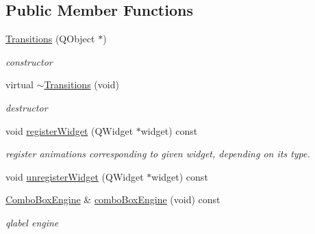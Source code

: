 \subsection*{Public Member Functions}
\begin{DoxyCompactItemize}
\item 
\mbox{\label{class_transitions_a23f782436a280c05ab98de42a51429d0}} 
\hyperlink{class_transitions_a23f782436a280c05ab98de42a51429d0}{Transitions} (Q\+Object $\ast$)
\begin{DoxyCompactList}\small\item\em constructor \end{DoxyCompactList}\item 
\mbox{\label{class_transitions_a1a6058f364276b83832cc7036c8f2f62}} 
virtual \hyperlink{class_transitions_a1a6058f364276b83832cc7036c8f2f62}{$\sim$\+Transitions} (void)
\begin{DoxyCompactList}\small\item\em destructor \end{DoxyCompactList}\item 
\mbox{\label{class_transitions_a38f0103ea44d0ff17dd8b3164881d9a1}} 
void \hyperlink{class_transitions_a38f0103ea44d0ff17dd8b3164881d9a1}{register\+Widget} (Q\+Widget $\ast$widget) const
\begin{DoxyCompactList}\small\item\em register animations corresponding to given widget, depending on its type. \end{DoxyCompactList}\item 
void \hyperlink{class_transitions_a4bffdba4ba7227b8724a1496cc885dae}{unregister\+Widget} (Q\+Widget $\ast$widget) const
\item 
\mbox{\label{class_transitions_a94c6e67ee72c2a434b280b01d5467ac1}} 
\hyperlink{class_combo_box_engine}{Combo\+Box\+Engine} \& \hyperlink{class_transitions_a94c6e67ee72c2a434b280b01d5467ac1}{combo\+Box\+Engine} (void) const
\begin{DoxyCompactList}\small\item\em qlabel engine \end{DoxyCompactList}\item 
\mbox{\label{class_transitions_a4b36d0bb18887994011b9ad2b3c0fbe8}} 

\end{DoxyCompactItemize}
